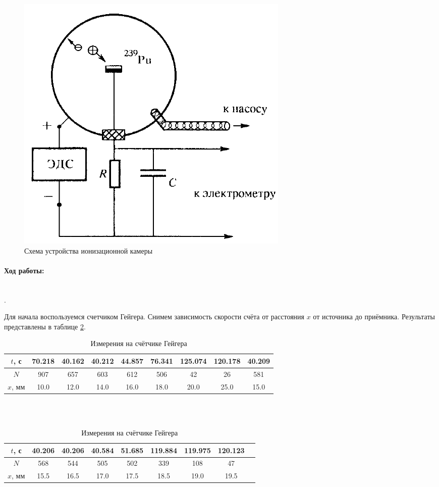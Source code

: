 \documentclass[a4paper, 12pt]{article}
\newcommand{\parag}[1]{\paragraph*{#1:}}
\newcounter{Points}
\newcommand{\point}{\arabic{Points}. \addtocounter{Points}{1}}
\begin{document}
\begin{figure}[H]
    \includegraphics[scale = 0.4]{Workplace3}
    \centering
    \caption{Схема устройства ионизационной камеры}
    \label{img:work1}
\end{figure}

\parag {Ход работы} ~\\

\point Для начала воспользуемся счетчиком Гейгера. Снимем зависимость скорости счёта от расстояния $x$ от источника до приёмника. Результаты представлены в таблице \ref{tab:geig}.

\begin{table}[H]
    \centering
    \begin{tabular}{|c|c|c|c|c|c|c|c|c|}
        \hline
        $t$, с & 70.218 & 40.162 & 40.212 & 44.857 & 76.341 & 125.074 & 120.178 & 40.209 \\ \hline
        $N$ & 907 & 657 & 603 & 612 & 506 & 42 & 26 & 581 \\ \hline
        $x$, мм & 10.0 & 12.0 & 14.0 & 16.0 & 18.0 & 20.0 & 25.0 & 15.0 \\ \hline
    \end{tabular}
    \\~\\
    \begin{tabular}{|c|c|c|c|c|c|c|c|c|}
        \hline
        $t$, с & 40.206 & 40.206 & 40.584 & 51.685 & 119.884 & 119.975 & 120.123 \\ \hline
        $N$ & 568 & 544 & 505 & 502 & 339 & 108 & 47 \\ \hline
        $x$, мм & 15.5 & 16.5 & 17.0 & 17.5 & 18.5 & 19.0 & 19.5 \\ \hline
    \end{tabular}
    \caption {Измерения на счётчике Гейгера}
    \label{tab:geig}
\end{table}
\end{document}
